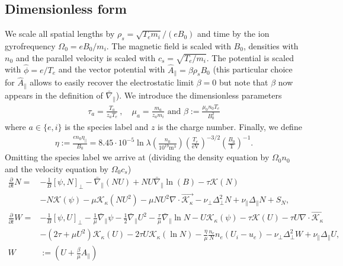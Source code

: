 \subsection{Dimensionless form}
We scale all spatial lengths by $\rho_s = \sqrt{T_e m_i}/(eB_0)$ and time by the ion gyrofrequency $\Omega_0 = eB_0/m_i$.
The magnetic field is scaled with $B_0$, densities with $n_0$ and the parallel velocity is scaled with $c_s = \sqrt{T_e/m_i}$.
The potential is scaled with $\hat \phi = e/T_e$ and the vector potential with 
$\hat A_\parallel = \beta \rho_s B_0$ (this particular choice for $\hat
A_\parallel$ allows to easily recover the electrostatic limit $\beta = 0$ but
note that $\beta$ now appears in the definition of $\bar \nabla_\parallel$).
We introduce the dimensionless parameters
\begin{align}
  \tau_a = \frac{T_a}{z_aT_e}~,\quad \mu_a = \frac{m_a}{z_am_i}\text{ and } 
  \beta:=\frac{\mu_0 n_0 T_e}{B_0^2}
  \label{}
\end{align}
where $a\in\{e,i\}$ is the species label and $z$ is the charge number. Finally, we define
\begin{align}
  \eta:=\frac{en_0\eta_\parallel}{B_0} = 8.45\cdot 10^{-5}\ln \lambda \left(\frac{n_0}{10^{19}\text{m}^3}\right) \left(\frac{T_e}{\text{eV}}\right)^{-3/2} \left(\frac{B_0}{\text{T}}\right)^{-1}.
    \label{eq:resistivity}
\end{align}
Omitting the species label we arrive at (dividing the density equation by $\Omega_0n_0$ and the velocity equation by $\Omega_0 c_s$)
\begin{subequations}
    \begin{align}
    \frac{\partial}{\partial t} N =&
        - \frac{1}{B}[\psi, N]_{\perp}%
        - \bar \nabla_\parallel \left( NU\right)
        + NU\bar \nabla_\parallel\ln(B)
        - \tau \mathcal K(N) \nonumber \\&
        - N \mathcal K(\psi)
        -\mu \mathcal K_\kappa(NU^2)
        -\mu NU^2\nabla\cdot \vec{ \mathcal K_\kappa}
        - \nu_\perp\Delta_\perp^2 N + \nu_\parallel \Delta_\parallel N + S_N, \\
    \frac{\partial}{\partial t} W =&
        - \frac{1}{B}\left[\psi, U\right]_{\perp}%
        - \frac{1}{\mu} \bar \nabla_\parallel \psi%
        - \frac{1}{2}\bar \nabla_\parallel U^2
        -\frac{\tau}{\mu} \bar \nabla_\parallel \ln N
        - U\mathcal K_\kappa(\psi)
        - \tau \mathcal K(U)
        -\tau U\nabla\cdot\vec{ \mathcal K_\kappa}\nonumber\\&
        - \left(2\tau + {\mu}U^2\right) \mathcal K_\kappa (U)
        -2\tau U\mathcal K_\kappa(\ln N)
        - \frac{\eta}{\mu} \frac{n_e}{N}n_e(U_i - u_e)
        - \nu_\perp\Delta_\perp^2 W + \nu_\parallel \Delta_\parallel U ,
        \label{eq:EgyrofluidU} \\
        W&:= \left( U + \frac{\beta}{\mu}A_\parallel\right)
    \end{align}
    \label{eq:Egyrofluid}
\end{subequations}
